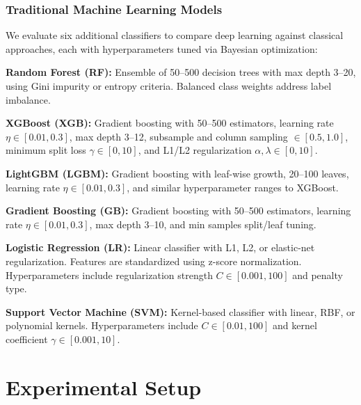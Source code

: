 \documentclass[a4paper,10pt,conference]{IEEEtran}
\newcommand{\todoitem}[1]{\textcolor{red}{[TODO: #1]}}
\begin{document}
\subsubsection{Traditional Machine Learning Models}

We evaluate six additional classifiers to compare deep learning against classical approaches, each with hyperparameters tuned via Bayesian optimization:

\textbf{Random Forest (RF):} Ensemble of 50--500 decision trees with max depth 3--20, using Gini impurity or entropy criteria. Balanced class weights address label imbalance.

\textbf{XGBoost (XGB):} Gradient boosting with 50--500 estimators, learning rate $\eta \in [0.01, 0.3]$, max depth 3--12, subsample and column sampling $\in [0.5, 1.0]$, minimum split loss $\gamma \in [0, 10]$, and L1/L2 regularization $\alpha, \lambda \in [0, 10]$.

\textbf{LightGBM (LGBM):} Gradient boosting with leaf-wise growth, 20--100 leaves, learning rate $\eta \in [0.01, 0.3]$, and similar hyperparameter ranges to XGBoost.

\textbf{Gradient Boosting (GB):} Gradient boosting with 50--500 estimators, learning rate $\eta \in [0.01, 0.3]$, max depth 3--10, and min samples split/leaf tuning.

\textbf{Logistic Regression (LR):} Linear classifier with L1, L2, or elastic-net regularization. Features are standardized using z-score normalization. Hyperparameters include regularization strength $C \in [0.001, 100]$ and penalty type.

\textbf{Support Vector Machine (SVM):} Kernel-based classifier with linear, RBF, or polynomial kernels. Hyperparameters include $C \in [0.01, 100]$ and kernel coefficient $\gamma \in [0.001, 10]$.

\section{Experimental Setup}
\label{sec:experimental_setup}


\end{document}
